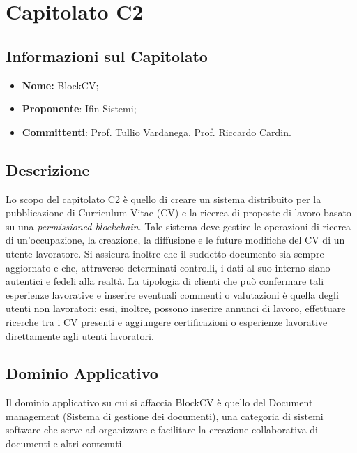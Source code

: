 \section{Capitolato C2}
\subsection{Informazioni sul Capitolato}
  \begin{itemize}
    \item \textbf{Nome:}
    BlockCV;
    \item \textbf{Proponente}:
    Ifin Sistemi;
    \item \textbf{Committenti}:
    Prof. Tullio Vardanega, Prof. Riccardo Cardin.
  \end{itemize}

\subsection{Descrizione}
  Lo scopo del capitolato C2 è quello di creare un sistema distribuito per la pubblicazione di Curriculum Vitae (CV) e la ricerca di proposte di lavoro basato su una \textit{permissioned blockchain}. Tale sistema deve gestire le operazioni di ricerca di un'occupazione, la creazione, la diffusione e le future modifiche del CV di un utente lavoratore. Si assicura inoltre che il suddetto documento sia sempre aggiornato e che, attraverso determinati controlli, i dati al suo interno siano autentici e fedeli alla realtà.
  \newline \newline La tipologia di clienti che può confermare tali esperienze lavorative e inserire eventuali commenti o valutazioni è quella degli utenti non lavoratori: essi, inoltre, possono inserire annunci di lavoro, effettuare ricerche tra i CV presenti e aggiungere certificazioni o esperienze lavorative direttamente agli utenti lavoratori.

\subsection{Dominio Applicativo}
  Il dominio applicativo su cui si affaccia BlockCV è quello del Document management (Sistema di gestione dei documenti), una categoria di sistemi software che serve ad organizzare e facilitare la creazione collaborativa di documenti e altri contenuti.

